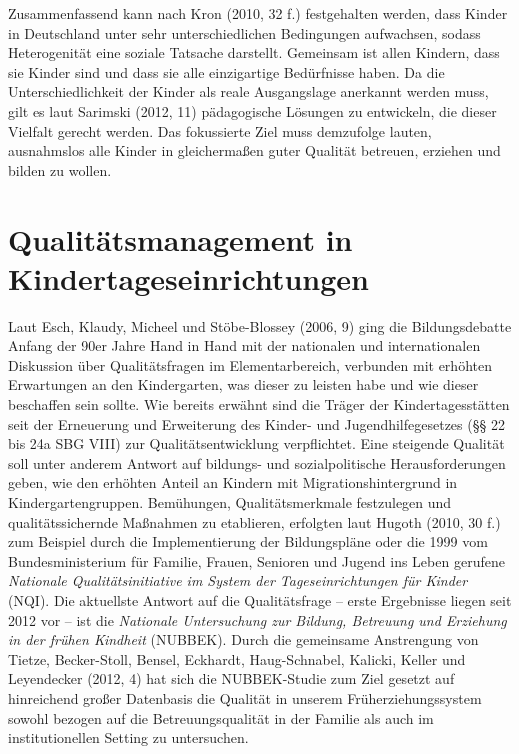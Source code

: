 Zusammenfassend kann nach Kron (2010, 32 f.) festgehalten werden, dass Kinder in Deutschland unter sehr unterschiedlichen Bedingungen aufwachsen, sodass Heterogenität eine soziale Tatsache darstellt. 
Gemeinsam ist allen Kindern, dass sie Kinder sind und dass sie alle einzigartige Bedürfnisse haben. 
Da die Unterschiedlichkeit der Kinder als reale Ausgangslage anerkannt werden muss, gilt es laut Sarimski (2012, 11) pädagogische Lösungen zu entwickeln, die dieser Vielfalt gerecht werden. Das fokussierte Ziel muss demzufolge lauten, ausnahmslos alle Kinder in gleichermaßen guter Qualität betreuen, erziehen und bilden zu wollen.  

\section{Qualitätsmanagement in Kindertageseinrichtungen}

Laut Esch, Klaudy, Micheel und Stöbe-Blossey (2006, 9) ging die Bildungsdebatte Anfang der 90er Jahre Hand in Hand mit der nationalen und internationalen Diskussion über Qualitätsfragen im Elementarbereich, verbunden mit erhöhten Erwartungen an den Kindergarten, was dieser zu leisten habe und wie dieser beschaffen sein sollte. Wie bereits erwähnt sind die Träger der Kindertagesstätten seit der Erneuerung und Erweiterung des Kinder- und Jugendhilfegesetzes (§§ 22 bis 24a SBG VIII) zur Qualitätsentwicklung verpflichtet. Eine steigende Qualität soll unter anderem Antwort auf bildungs- und sozialpolitische Herausforderungen geben, wie den erhöhten Anteil an Kindern mit Migrationshintergrund in Kindergartengruppen.
Bemühungen, Qualitätsmerkmale festzulegen und qualitätssichernde Maßnahmen zu etablieren, erfolgten laut Hugoth (2010, 30 f.) zum Beispiel durch die Implementierung der Bildungspläne oder die 1999 vom Bundesministerium für Familie, Frauen, Senioren und Jugend ins Leben gerufene \emph{Nationale Qualitätsinitiative im System der Tageseinrichtungen für Kinder} (NQI). Die aktuellste Antwort auf die Qualitätsfrage -- erste Ergebnisse liegen seit 2012 vor -- ist die \emph{Nationale Untersuchung zur Bildung, Betreuung und Erziehung in der frühen Kindheit} (NUBBEK). Durch die gemeinsame Anstrengung von Tietze, Becker-Stoll, Bensel, Eckhardt, Haug-Schnabel, Kalicki, Keller und Leyendecker (2012, 4) hat sich die  NUBBEK-Studie zum Ziel gesetzt auf hinreichend großer Datenbasis die Qualität in unserem Früherziehungssystem sowohl bezogen auf die Betreuungsqualität in der Familie als auch im institutionellen Setting zu untersuchen. 
  
